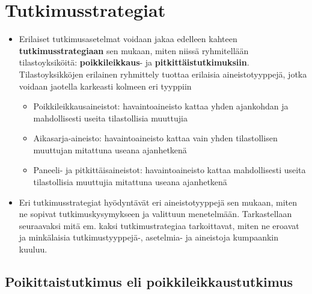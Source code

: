 \documentclass[
]{book}
\providecommand{\tightlist}{%
  \setlength{\itemsep}{0pt}\setlength{\parskip}{0pt}}
\begin{document}
\hypertarget{alaluku122}{%
\section{Tutkimusstrategiat}\label{alaluku122}}

\begin{itemize}
\tightlist
\item
  Erilaiset tutkimusasetelmat voidaan jakaa edelleen kahteen \textbf{tutkimusstrategiaan} sen mukaan, miten niissä ryhmitellään tilastoyksiköitä: \textbf{poikkileikkaus}- ja \textbf{pitkittäistutkimuksiin}. Tilastoyksikköjen erilainen ryhmittely tuottaa erilaisia aineistotyyppejä, jotka voidaan jaotella karkeasti kolmeen eri tyyppiin

  \begin{itemize}
  \tightlist
  \item
    Poikkileikkausaineistot: havaintoaineisto kattaa yhden ajankohdan ja mahdollisesti useita tilastollisia muuttujia
  \item
    Aikasarja-aineisto: havaintoaineisto kattaa vain yhden tilastollisen muuttujan mitattuna useana ajanhetkenä
  \item
    Paneeli- ja pitkittäisaineistot: havaintoaineisto kattaa mahdollisesti useita tilastollisia muuttujia mitattuna useana ajanhetkenä
  \end{itemize}
\item
  Eri tutkimusstrategiat hyödyntävät eri aineistotyyppejä sen mukaan, miten ne sopivat tutkimuskysymykseen ja valittuun menetelmään. Tarkastellaan seuraavaksi mitä em. kaksi tutkimustrategiaa tarkoittavat, miten ne eroavat ja minkälaisia tutkimustyyppejä-, asetelmia- ja aineistoja kumpaankin kuuluu.
\end{itemize}

\hypertarget{poikittaistutkimus-eli-poikkileikkaustutkimus}{%
\subsection{\texorpdfstring{\textbf{Poikittaistutkimus} eli \textbf{poikkileikkaustutkimus}}{Poikittaistutkimus eli poikkileikkaustutkimus}}\label{poikittaistutkimus-eli-poikkileikkaustutkimus}}
\end{document}
